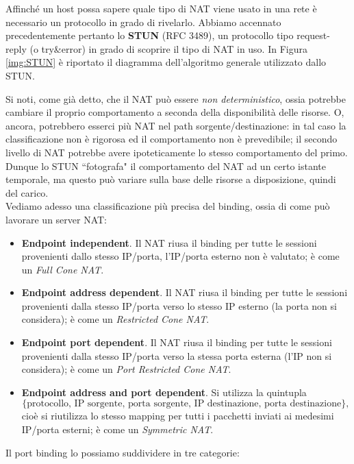 Affinché un host possa sapere quale tipo di NAT viene usato in una rete è necessario un protocollo in grado di rivelarlo. Abbiamo accennato precedentemente pertanto lo \textbf{STUN} (RFC 3489), un protocollo tipo request-reply (o try\&error) in grado di scoprire il tipo di NAT in uso. In Figura \ref{img:STUN} è riportato il diagramma dell'algoritmo generale utilizzato dallo STUN.

Si noti, come già detto, che il NAT può essere \textit{non deterministico}, ossia potrebbe cambiare il proprio comportamento a seconda della disponibilità delle risorse. O, ancora, potrebbero esserci più NAT nel path sorgente/destinazione: in tal caso la classificazione non è rigorosa ed il comportamento non è prevedibile; il secondo livello di NAT potrebbe avere ipoteticamente lo stesso comportamento del primo. Dunque lo STUN \textquotedblleft fotografa" il comportamento del NAT ad un certo istante temporale, ma questo può variare sulla base delle risorse a disposizione, quindi del carico.\\
Vediamo adesso una classificazione più precisa del binding, ossia di come può lavorare un server NAT:
\begin{itemize}
	\item \textbf{Endpoint independent}. Il NAT riusa il binding per tutte le sessioni provenienti dallo stesso IP/porta, l'IP/porta esterno non è valutato; è come un \textit{Full Cone NAT}.
	
	\item \textbf{Endpoint address dependent}. Il NAT riusa il binding per tutte le sessioni provenienti dalla stesso IP/porta verso lo stesso IP esterno (la porta non si considera); è come un \textit{Restricted Cone NAT}.
	
	\item \textbf{Endpoint port dependent}. Il NAT riusa il binding per tutte le sessioni provenienti dalla stesso IP/porta verso la stessa porta esterna (l'IP non si considera); è come un \textit{Port Restricted Cone NAT}.
		
	\item \textbf{Endpoint address and port dependent}. Si utilizza la quintupla $$\{\text{protocollo, IP sorgente, porta sorgente, IP destinazione, porta destinazione}\},$$ cioè si riutilizza lo stesso mapping per tutti i pacchetti inviati ai medesimi IP/porta esterni; è come un \textit{Symmetric NAT}.
	
\end{itemize}
Il port binding lo possiamo suddividere in tre categorie:
